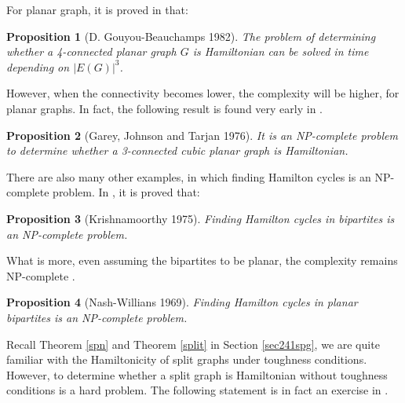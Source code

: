 \documentclass[12pt]{report}
\newtheorem{proposition}{Proposition}
\begin{document}
For planar graph, it is proved in \cite{gouyou1982hamiltonian} that:
\begin{proposition}[D. Gouyou-Beauchamps 1982]
The problem of determining whether a 4-connected planar graph $G$ is Hamiltonian can be solved in time depending on $|E(G)|^3$.
\end{proposition}


However, when the connectivity becomes lower, the complexity will be higher, for planar graphs. In fact, the following result is found very early in \cite{garey1976planar}.
\begin{proposition}[Garey, Johnson and Tarjan 1976]
It is an NP-complete problem to determine whether a 3-connected cubic planar graph is Hamiltonian.
\end{proposition}

There are also many other examples, in which finding Hamilton cycles is an NP-complete problem. In \cite{krishnamoorthy1975np}, it is proved that:
\begin{proposition}[Krishnamoorthy 1975]\label{popfhcbnpc75}
Finding Hamilton cycles in bipartites is an NP-complete problem.
\end{proposition}

What is more, even assuming the bipartites to be planar, the complexity remains NP-complete \cite{nash1969hamiltonian}.
\begin{proposition}[Nash-Willians 1969]
Finding Hamilton cycles in planar bipartites is an NP-complete problem.
\end{proposition}

Recall Theorem \ref{spn} and Theorem \ref{split} in Section \ref{sec241spg}, we are quite familiar with the Hamiltonicity of split graphs under toughness conditions. However, to determine whether a split graph is Hamiltonian without toughness conditions is a hard problem. The following statement is in fact an exercise in \cite{golumbicalgorithmic}.
\end{document}
